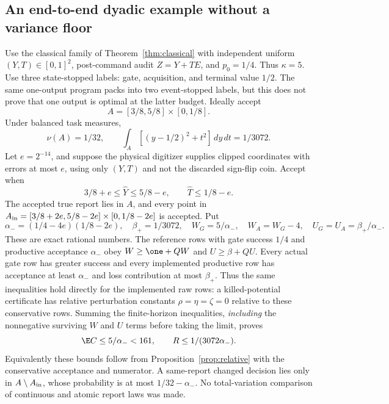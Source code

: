 \subsection*{An end-to-end dyadic example without a variance floor}
Use the classical family of Theorem~\ref{thm:classical} with independent uniform $(Y,T)\in[0,1]^2$, post-command audit $Z=Y+TE$, and $p_0=1/4$. Thus $\kappa=5$. Use three state-stopped labels: gate, acquisition, and terminal value $1/2$. The same one-output program packs into two event-stopped labels, but this does not prove that one output is optimal at the latter budget. Ideally accept
\[
 A=[3/8,5/8]\times[0,1/8].
\]
Under balanced task measures,
\begin{equation}\label{eq:dyadic-ideal}
 \nu(A)=1/32,\qquad
 \int_A[(y-1/2)^2+t^2]\,dy\,dt=1/3072.
\end{equation}
Let $e=2^{-14}$, and suppose the physical digitizer supplies clipped coordinates with errors at most $e$, using only $(Y,T)$ and not the discarded sign-flip coin. Accept when
\[
 3/8+e\le\widehat Y\le5/8-e,\qquad \widehat T\le1/8-e.
\]
The accepted true report lies in $A$, and every point in
$A_{\rm in}=[3/8+2e,5/8-2e]\times[0,1/8-2e]$ is accepted. Put
\begin{equation}\label{eq:dyadic-constants}
 \alpha_-=(1/4-4e)(1/8-2e),\quad
 \beta_+=1/3072,\quad
 W_G=5/\alpha_-,\quad W_A=W_G-4,\quad
 U_G=U_A=\beta_+/\alpha_-.
\end{equation}
These are exact rational numbers. The reference rows with gate success $1/4$ and productive acceptance $\alpha_-$ obey
$W\ge\one+QW$ and $U\ge\beta+QU$. Every actual gate row has greater success and every implemented productive row has acceptance at least $\alpha_-$ and loss contribution at most $\beta_+$. Thus the same inequalities hold directly for the implemented raw rows: a killed-potential certificate has relative perturbation constants $\rho=\eta=\zeta=0$ relative to these conservative rows. Summing the finite-horizon inequalities, \emph{including} the nonnegative surviving $W$ and $U$ terms before taking the limit, proves
\begin{equation}\label{eq:dyadic-final}
 \E C\le 5/\alpha_-<161,\qquad R\le1/(3072\alpha_-).
\end{equation}
Equivalently these bounds follow from Proposition~\ref{prop:relative} with the conservative acceptance and numerator. A same-report changed decision lies only in $A\setminus A_{\rm in}$, whose probability is at most $1/32-\alpha_-$. No total-variation comparison of continuous and atomic report laws was made.

